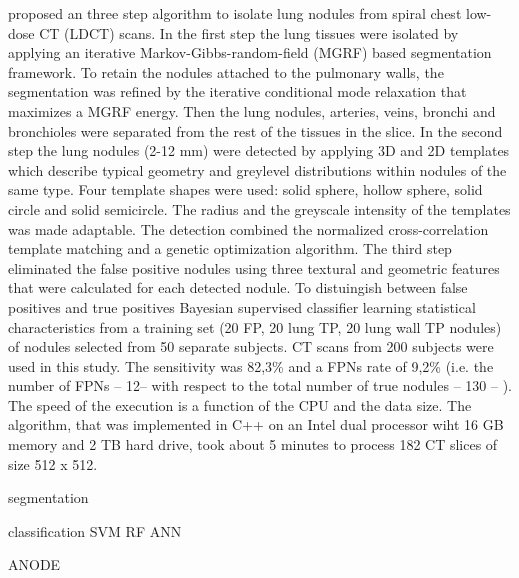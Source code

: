 \cite{elbaz} proposed an three step algorithm to isolate lung nodules from
spiral chest low-dose CT (LDCT) scans. In the first step the lung tissues were
isolated by applying an iterative Markov-Gibbs-random-field (MGRF) based
segmentation framework. To retain the nodules attached to the pulmonary walls, the
segmentation was refined by the iterative conditional mode relaxation that
maximizes a MGRF energy. Then the lung nodules, arteries, veins, bronchi and
bronchioles were separated from the rest of the tissues in the slice. In the
second step the lung nodules (2-12 mm) were detected by applying 3D and 2D
templates which describe typical geometry and greylevel distributions within
nodules of the same type. Four template shapes were used: solid sphere, hollow
sphere, solid circle and solid semicircle. The radius and the greyscale
intensity of the templates was made adaptable. The detection combined the
normalized cross-correlation template matching and a genetic optimization
algorithm. The third step eliminated the false positive nodules using three
textural and geometric features that were calculated for each detected nodule.
To distuingish between false positives and true positives Bayesian supervised
classifier learning statistical characteristics from a training set (20 FP, 20
lung TP, 20 lung wall TP nodules) of nodules selected from 50 separate subjects.
CT scans from 200 subjects were used in this study. The sensitivity was 82,3\%
and a FPNs rate of 9,2\% (i.e. the number of FPNs -- 12-- with respect to the
total number of true nodules -- 130 -- ). The speed of the execution is a
function of the CPU and the data size. The algorithm, that was implemented in
C++ on an Intel dual processor wiht 16 GB memory and 2 TB hard drive, took about
5 minutes to process 182 CT slices of size 512 x 512.



segmentation

classification
	SVM
	RF
	ANN
	
ANODE

